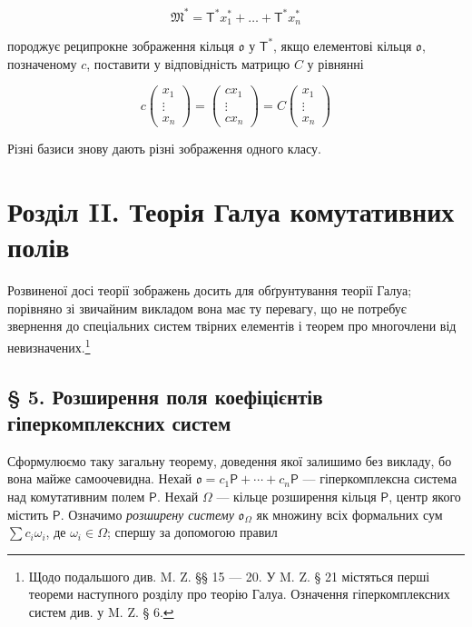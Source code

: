 \documentclass[11pt]{article}
\newcommand{\srcfn}[2]{\footnote{#2}}
\begin{document}
\[\mathfrak{M}^* = \mathsf{T}^* x_1^* + \dots + \mathsf{T}^* x_n^*\]

породжує реципрокне зображення кільця \(\mathfrak{o}\) у \(\mathsf T^*\), якщо елементові кільця \(\mathfrak{o}\), позначеному \(c\), поставити у відповідність матрицю \(C\) у рівнянні

\[
c\begin{pmatrix}x_1\\ \vdots\\ x_n\end{pmatrix}
=\begin{pmatrix}cx_1\\ \vdots\\ cx_n\end{pmatrix}
=C\begin{pmatrix}x_1\\ \vdots\\ x_n\end{pmatrix}
\]

Різні базиси знову дають різні зображення одного класу.

\section*{Розділ II. Теорія Галуа комутативних полів}\label{kapitel-ii.-galoissche-theorie-kommutativer-koerper}

Розвиненої досі теорії зображень досить для обґрунтування теорії Галуа; порівняно зі звичайним викладом вона має ту перевагу, що не потребує звернення до спеціальних систем твірних елементів і теорем про многочлени від невизначених.\srcfn{1}{Щодо подальшого див. M. Z. §§ 15 --- 20. У M. Z. § 21 містяться перші теореми наступного розділу про теорію Галуа. Означення гіперкомплексних систем див. у M. Z. § 6.}

\subsection*{§ 5. Розширення поля коефіцієнтів гіперкомплексних систем}\label{koeffizientenerweiterung-hyperkomplexer-systeme}

Сформулюємо таку загальну теорему, доведення якої залишимо без викладу, бо вона майже самоочевидна. Нехай \(\mathfrak{o}=c_1\mathsf P+\cdots+c_n\mathsf P\) --- гіперкомплексна система над комутативним полем \(\mathsf P\). Нехай \(\Omega\) --- кільце розширення кільця \(\mathsf P\), центр якого містить \(\mathsf P\). Означимо \emph{розширену систему} \(\mathfrak{o}_{\Omega}\) як множину всіх формальних сум \(\sum c_i\omega_i\), де \(\omega_i\in\Omega\); спершу за допомогою правил
\end{document}
